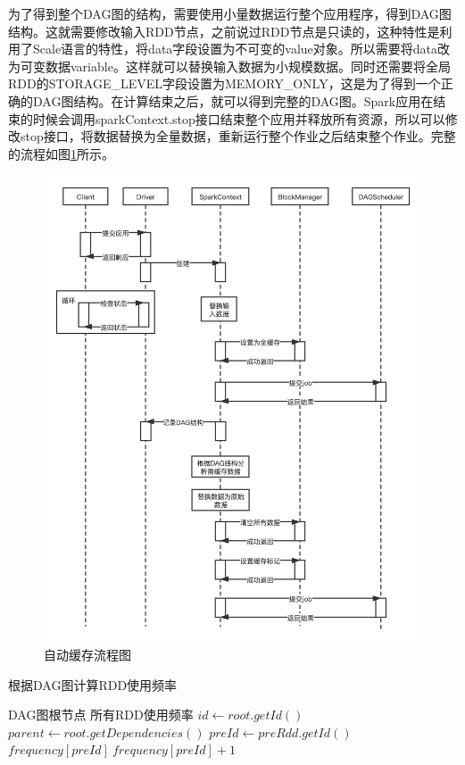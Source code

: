 为了得到整个DAG图的结构，需要使用小量数据运行整个应用程序，得到DAG图结构。这就需要修改输入RDD节点，之前说过RDD节点是只读的，这种特性是利用了Scale语言的特性，将data字段设置为不可变的value对象。所以需要将data改为可变数据variable。这样就可以替换输入数据为小规模数据。同时还需要将全局RDD的STORAGE\_LEVEL字段设置为MEMORY\_ONLY，这是为了得到一个正确的DAG图结构。在计算结束之后，就可以得到完整的DAG图。Spark应用在结束的时候会调用sparkContext.stop接口结束整个应用并释放所有资源，所以可以修改stop接口，将数据替换为全量数据，重新运行整个作业之后结束整个作业。完整的流程如图\ref{fig:auto-cache}所示。

\begin{figure}[htbp]
    \centering
    \includegraphics[width=1\textwidth]{Img/自动缓存流程图.png}
    \caption{自动缓存流程图}
    \label{fig:auto-cache}
\end{figure}

\begin{algorithm}  
    \caption{根据DAG图计算RDD使用频率}  
    \begin{algorithmic}[1] %
        \Require DAG图根节点
        \Ensure 所有RDD使用频率
            \State $id \gets root.getId()$
            \State $parent \gets root.getDependencies()$
                \State $preId \gets preRdd.getId()$
                \State $frequency[preId] \ frequency[preId] + 1$
                \State {}
            \EndFor
        \EndFunction  
    \end{algorithmic}
    \label{alg:cal-fre}
\end{algorithm}

